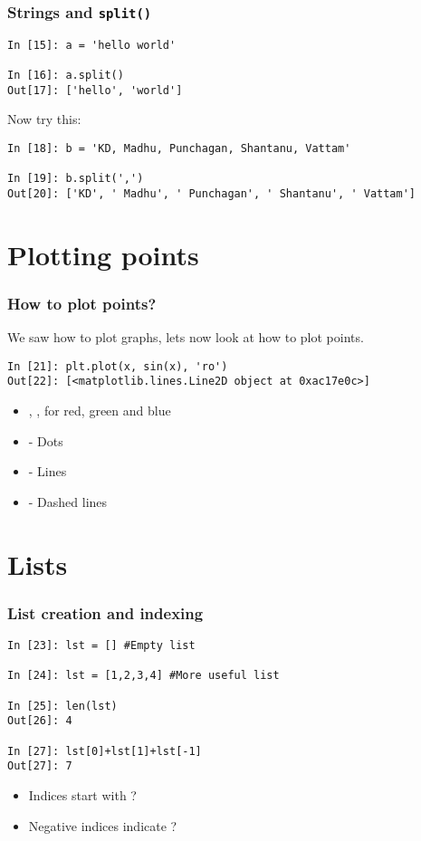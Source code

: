\documentclass[14pt,compress]{beamer}
\newcounter{time}
\newcommand{\inctime}[1]{\addtocounter{time}{#1}{\tiny \thetime\ m}}
\newcommand{\typ}[1]{\texttt{#1}}
\newcommand{\kwrd}[1]{ \texttt{\textbf{\color{blue}{#1}}}  }
\begin{document}
\begin{frame}[fragile]\frametitle{Strings and \typ{split()}}
  \begin{lstlisting}
In [15]: a = 'hello world'

In [16]: a.split()
Out[17]: ['hello', 'world']
  \end{lstlisting}
Now try this:
  \begin{lstlisting}
In [18]: b = 'KD, Madhu, Punchagan, Shantanu, Vattam'

In [19]: b.split(',')
Out[20]: ['KD', ' Madhu', ' Punchagan', ' Shantanu', ' Vattam']
  \end{lstlisting}
\inctime{5}
\end{frame}

\section{Plotting points}
\begin{frame}[fragile]
\frametitle{How to plot points?}
We saw how to plot graphs, lets now look at how to plot points.\\
\begin{lstlisting}
In [21]: plt.plot(x, sin(x), 'ro')
Out[22]: [<matplotlib.lines.Line2D object at 0xac17e0c>]
\end{lstlisting}
\begin{itemize}
  \item \kwrd{'r'},\kwrd{'g'},\kwrd{'b'} for red, green and blue
  \item \kwrd{'o'} - Dots
  \item \kwrd{'-'} - Lines
  \item \kwrd{'- -'} - Dashed lines
\end{itemize}
\inctime{5}
\end{frame}

\section{Lists}

\begin{frame}[fragile]
  \frametitle{List creation and indexing}
\begin{lstlisting}
In [23]: lst = [] #Empty list

In [24]: lst = [1,2,3,4] #More useful list

In [25]: len(lst)
Out[26]: 4

In [27]: lst[0]+lst[1]+lst[-1]
Out[27]: 7
\end{lstlisting}
\begin{itemize}
  \item Indices start with ?
  \item Negative indices indicate ?
  \end{itemize}
\end{frame}
\end{document}
